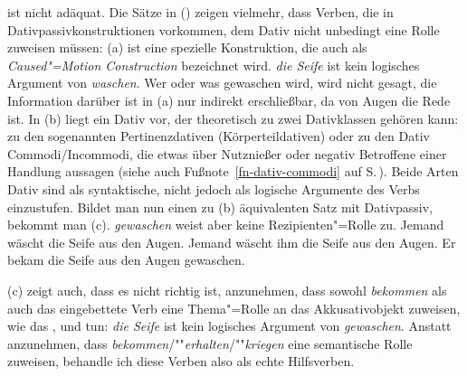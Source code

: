ist nicht adäquat.
Die Sätze in () zeigen vielmehr, dass Verben, die in Dativpassivkonstruktionen
vorkommen, dem Dativ nicht unbedingt eine Rolle zuweisen müssen:
(a) ist eine spezielle Konstruktion, die auch als \emph{Caused"=Motion
Construction} bezeichnet wird. \emph{die Seife} ist kein logisches
Argument von \emph{waschen}. Wer oder was gewaschen wird, wird nicht gesagt,
die Information darüber ist in (a) nur indirekt erschließbar, da
von Augen die Rede ist. In (b) liegt ein Dativ vor, der theoretisch
zu zwei Dativklassen gehören kann: zu den sogenannten Pertinenzdativen
(Körperteildativen) oder zu den Dativ Commodi/Incommodi,
die etwas über Nutznießer oder negativ Betroffene einer Handlung aussagen
(siehe auch Fußnote~\ref{fn-dativ-commodi} auf S.\,\pageref{fn-dativ-commodi}). Beide Arten
Dativ sind als syntaktische, nicht jedoch als logische Argumente des Verbs einzustufen.
Bildet man nun einen zu (b) äquivalenten Satz mit Dativpassiv,
bekommt man (c). \emph{gewaschen} weist aber keine Rezipienten"=Rolle zu.
\eal
\label{ex-bekommen-passive-und-waschen}
\ex Jemand wäscht     die Seife aus den Augen.
\ex Jemand wäscht ihm die Seife aus den Augen.
\ex\label{ex-er-bekam-die-seife-aus-den-augen-gewaschen}
Er bekam die Seife aus den Augen gewaschen.
\zl

\noindent
(c) zeigt auch, dass es nicht richtig ist, anzunehmen, dass sowohl \emph{bekommen} als auch das
eingebettete Verb eine Thema"=Rolle an das Akkusativobjekt zuweisen,
wie das \citet[]{Haider86}, \citet[]{HM94a}
und \citet[]{Kathol2000a} tun: \emph{die Seife} ist kein logisches
Argument von \emph{gewaschen}.
Anstatt anzunehmen, dass \emph{bekommen}/""\emph{erhalten}/""\emph{kriegen} 
eine semantische Rolle zuweisen, behandle ich diese Verben also als echte Hilfsverben.




